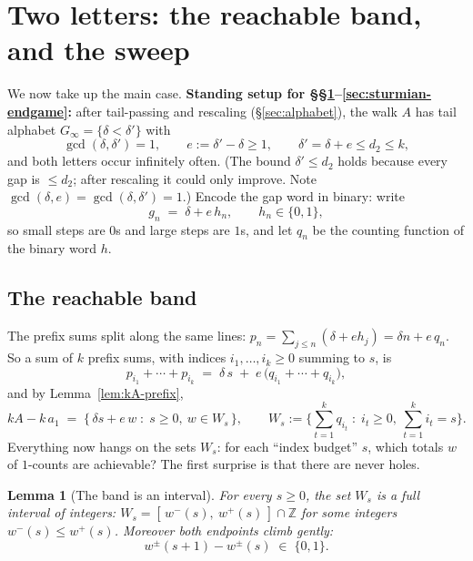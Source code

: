 \documentclass[11pt,reqno]{amsart}
\theoremstyle{plain}
\newtheorem{lemma}[theorem]{Lemma}
\theoremstyle{definition}
\theoremstyle{remark}
\newcommand{\ZZ}{\mathbb{Z}}
\newcommand{\Ginf}{G_\infty}
\begin{document}

\section{Two letters: the reachable band, and the sweep}\label{sec:widths}

We now take up the main case. \textbf{Standing setup for
\S\S\ref{sec:widths}--\ref{sec:sturmian-endgame}:} after tail-passing and rescaling
(\S\ref{sec:alphabet}), the walk $A$ has tail alphabet $\Ginf = \{\delta <
\delta'\}$ with
\[
  \gcd(\delta, \delta') = 1, \qquad
  e := \delta' - \delta \ge 1, \qquad
  \delta' = \delta + e \le d_2 \le k ,
\]
and both letters occur infinitely often. (The bound $\delta' \le d_2$ holds because
every gap is $\le d_2$; after rescaling it could only improve. Note
$\gcd(\delta, e) = \gcd(\delta, \delta') = 1$.) Encode the gap word in binary: write
\[
  g_n \;=\; \delta + e\,h_n, \qquad h_n \in \{0, 1\} ,
\]
so small steps are $0$s and large steps are $1$s, and let $q_n$ be the counting
function of the binary word $h$.

\subsection{The reachable band}

The prefix sums split along the same lines: $p_n = \sum_{j \le n} (\delta + e h_j) =
\delta n + e\,q_n$. So a sum of $k$ prefix sums, with indices $i_1, \dots, i_k \ge
0$ summing to $s$, is
\[
  p_{i_1} + \cdots + p_{i_k} \;=\; \delta\,s \;+\; e\,\big( q_{i_1} + \cdots +
  q_{i_k} \big) ,
\]
and by Lemma~\ref{lem:kA-prefix},
\begin{equation}\label{eq:two-letter-coords}
  kA - k\,a_1 \;=\; \big\{\, \delta s + e\,w \;:\; s \ge 0,\ w \in W_s \,\big\},
  \qquad
  W_s := \Big\{ \sum_{t=1}^{k} q_{i_t} \;:\; i_t \ge 0,\ \sum_{t=1}^k i_t = s \Big\} .
\end{equation}
Everything now hangs on the sets $W_s$: for each ``index budget'' $s$, which totals
$w$ of $1$-counts are achievable? The first surprise is that there are never holes.

\begin{lemma}[The band is an interval]\label{lem:interval-friendly}
For every $s \ge 0$, the set $W_s$ is a full interval of integers: $W_s =
[\,w^-(s),\ w^+(s)\,] \cap \ZZ$ for some integers $w^-(s) \le w^+(s)$. Moreover both
endpoints climb gently:
\[
  w^\pm(s+1) - w^\pm(s) \;\in\; \{0, 1\} .
\]
\end{lemma}
\end{document}
